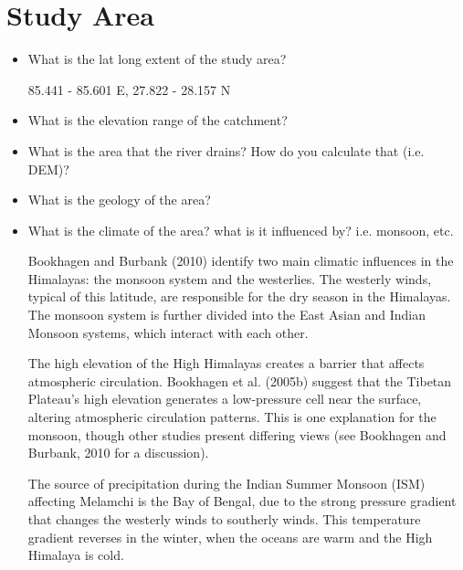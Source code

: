 
\section{Study Area}


\begin{itemize}

\item{What is the lat long extent of the study area?}

85.441 - 85.601 E, 27.822 - 28.157 N

\item{What is the elevation range of the catchment?}

\item{What is the area that the river drains? How do you calculate that (i.e. DEM)?}

\item{What is the geology of the area?}

\item{What is the climate of the area? what is it influenced by? i.e. monsoon, etc.}

Bookhagen and Burbank (2010) identify two main climatic influences in the Himalayas: the monsoon system and the westerlies. 
The westerly winds, typical of this latitude, are responsible for the dry season in the Himalayas.
The monsoon system is further divided into the East Asian and Indian Monsoon systems, which interact with each other.

The high elevation of the High Himalayas creates a barrier that affects atmospheric circulation. 
Bookhagen et al. (2005b) suggest that the Tibetan Plateau's high elevation generates a low-pressure cell near the surface, 
altering atmospheric circulation patterns. 
This is one explanation for the monsoon, though other studies present differing views (see Bookhagen and Burbank, 2010 for a discussion).

The source of precipitation during the Indian Summer Monsoon (ISM) affecting Melamchi is the Bay of Bengal, 
due to the strong pressure gradient that changes the westerly winds to southerly winds. This temperature gradient reverses in the winter,
when the oceans are warm and the High Himalaya is cold.







\end{itemize}
